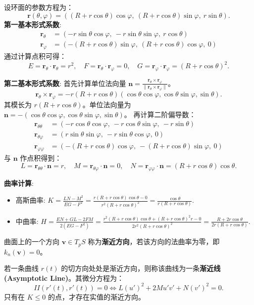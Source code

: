 \documentclass[lang=cn,10pt,thmcnt=section]{elegantbook}
\renewcommand{\vec}[1]{\mathbf{#1}}
\begin{document}
\begin{example}[环面的曲率计算]
    设环面的参数方程为：
    \[
    \bm{r}(\theta, \varphi) = \left( (R + r \cos\theta) \cos\varphi,\ (R + r \cos\theta) \sin\varphi,\ r \sin\theta \right).
    \]
    \textbf{第一基本形式系数}:
    \begin{align*}
    \bm{r}_\theta &= (-r \sin\theta \cos\varphi,\ -r \sin\theta \sin\varphi,\ r \cos\theta) \\
    \bm{r}_\varphi &= (-(R + r \cos\theta) \sin\varphi,\ (R + r \cos\theta) \cos\varphi,\ 0)
    \end{align*}
    通过计算点积可得：
    \[ E = \bm{r}_\theta \cdot \bm{r}_\theta = r^2, \quad F = \bm{r}_\theta \cdot \bm{r}_\varphi = 0, \quad G = \bm{r}_\varphi \cdot \bm{r}_\varphi = (R + r \cos\theta)^2. \]
    
    \textbf{第二基本形式系数}:
    首先计算单位法向量 $\bm{n} = \frac{\bm{r}_\theta \times \bm{r}_\varphi}{\|\bm{r}_\theta \times \bm{r}_\varphi\|}$。
    \[ \bm{r}_\theta \times \bm{r}_\varphi = -r(R+r\cos\theta)(\cos\theta\cos\varphi, \cos\theta\sin\varphi, \sin\theta). \]
    其模长为 $r(R+r\cos\theta)$。单位法向量为 $\bm{n} = -(\cos\theta\cos\varphi, \cos\theta\sin\varphi, \sin\theta)$。
    再计算二阶偏导数：
    \begin{align*}
    \bm{r}_{\theta\theta} &= (-r \cos\theta \cos\varphi,\ -r \cos\theta \sin\varphi,\ -r \sin\theta) \\
    \bm{r}_{\theta\varphi} &= (r \sin\theta \sin\varphi,\ -r \sin\theta \cos\varphi,\ 0) \\
    \bm{r}_{\varphi\varphi} &= (-(R + r \cos\theta) \cos\varphi,\ -(R + r \cos\theta) \sin\varphi,\ 0)
    \end{align*}
    与 $\bm{n}$ 作点积得到：
    \[ L = \bm{r}_{\theta\theta} \cdot \bm{n} = r, \quad M = \bm{r}_{\theta\varphi} \cdot \bm{n} = 0, \quad N = \bm{r}_{\varphi\varphi} \cdot \bm{n} = (R + r \cos\theta)\cos\theta. \]
    
    \textbf{曲率计算}:
    \begin{itemize}
        \item 高斯曲率: $K = \frac{LN - M^2}{EG - F^2} = \frac{r(R + r \cos\theta)\cos\theta - 0}{r^2(R + r \cos\theta)^2} = \frac{\cos\theta}{r(R + r \cos\theta)}$.
        \item 中曲率: $H = \frac{EN+GL-2FM}{2(EG-F^2)} = \frac{r^2(R+r\cos\theta)\cos\theta + (R+r\cos\theta)^2 r - 0}{2r^2(R+r\cos\theta)^2} = \frac{R + 2r\cos\theta}{2r(R + r \cos\theta)}$.
    \end{itemize}
\end{example}
\begin{definition}[渐近线]
    曲面上的一个方向 $\vec{v} \in T_pS$ 称为\textbf{渐近方向}，若该方向的法曲率为零，即 $k_n(\vec{v})=0$。
    
    若一条曲线 $r(t)$ 的切方向处处是渐近方向，则称该曲线为一条\textbf{渐近线 (Asymptotic Line)}。其微分方程为：
    \[
    II(r'(t), r'(t)) = 0 \iff L(u')^2 + 2M u'v' + N(v')^2 = 0.
    \]
    只有在 $K \le 0$ 的点，才存在实值的渐近方向。
\end{definition}
\end{document}
